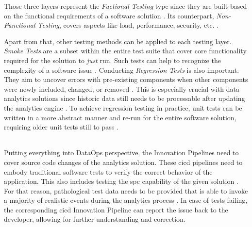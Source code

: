 Those three layers represent the \textit{Fuctional Testing} type since they are built based on the functional requirements of a software solution \cite[69]{Mahfuz2016}. Its counterpart, \textit{Non-Functional Testing}, covers aspects like load, performance, security, etc. \cite[70]{Mahfuz2016}.

Apart from that, other testing methods can be applied to each testing layer. \textit{Smoke Tests} are a subset within the entire test suite that cover core functionality required for the solution to \textit{just} run. Such tests can help to recognize the complexity of a software issue \cite[sec. 5]{Tarlinder2016}. Conducting \textit{Regression Tests} is also important. They aim to uncover errors with pre-existing components when other components were newly included, changed, or removed \cite[70]{Mahfuz2016}\cite{Mathur2013}. This is especially crucial with data analytics solutions since historic data still needs to be processable after updating the analytics engine \cite{Shen2019}. To achieve regression testing in practice, unit tests can be written in a more abstract manner and re-run for the entire software solution, requiring older unit tests still to pass \cite{Mathur2013}.
\\\

Putting everything into DataOps perspective, the Innovation Pipelines need to cover source code changes of the analytics solution. These \ac{cicd} pipelines need to embody traditional software tests to verify the correct behavior of the application. This also includes testing the \ac{spc} capability of the given solution \cite{DataKitchen2020}. For that reason, pathological test data needs to be provided that is able to invoke a majority of realistic events during the analytics process \cite[42]{Bergh2019}. In case of tests failing, the corresponding \ac{cicd} Innovation Pipeline can report the issue back to the developer, allowing for further understanding and correction.

